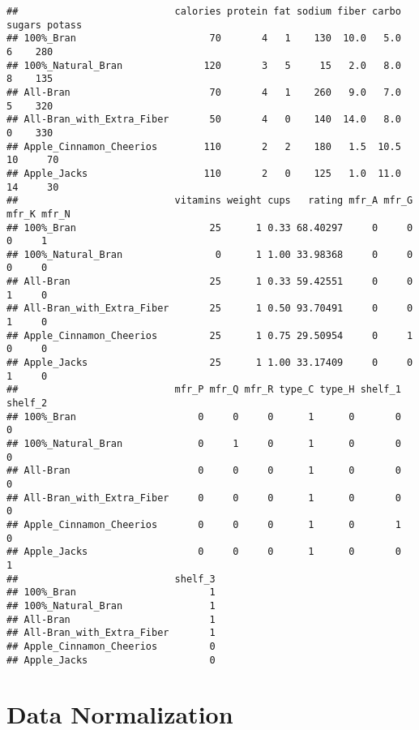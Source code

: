 \documentclass[
]{article}
\begin{document}
\begin{verbatim}
##                           calories protein fat sodium fiber carbo sugars potass
## 100%_Bran                       70       4   1    130  10.0   5.0      6    280
## 100%_Natural_Bran              120       3   5     15   2.0   8.0      8    135
## All-Bran                        70       4   1    260   9.0   7.0      5    320
## All-Bran_with_Extra_Fiber       50       4   0    140  14.0   8.0      0    330
## Apple_Cinnamon_Cheerios        110       2   2    180   1.5  10.5     10     70
## Apple_Jacks                    110       2   0    125   1.0  11.0     14     30
##                           vitamins weight cups   rating mfr_A mfr_G mfr_K mfr_N
## 100%_Bran                       25      1 0.33 68.40297     0     0     0     1
## 100%_Natural_Bran                0      1 1.00 33.98368     0     0     0     0
## All-Bran                        25      1 0.33 59.42551     0     0     1     0
## All-Bran_with_Extra_Fiber       25      1 0.50 93.70491     0     0     1     0
## Apple_Cinnamon_Cheerios         25      1 0.75 29.50954     0     1     0     0
## Apple_Jacks                     25      1 1.00 33.17409     0     0     1     0
##                           mfr_P mfr_Q mfr_R type_C type_H shelf_1 shelf_2
## 100%_Bran                     0     0     0      1      0       0       0
## 100%_Natural_Bran             0     1     0      1      0       0       0
## All-Bran                      0     0     0      1      0       0       0
## All-Bran_with_Extra_Fiber     0     0     0      1      0       0       0
## Apple_Cinnamon_Cheerios       0     0     0      1      0       1       0
## Apple_Jacks                   0     0     0      1      0       0       1
##                           shelf_3
## 100%_Bran                       1
## 100%_Natural_Bran               1
## All-Bran                        1
## All-Bran_with_Extra_Fiber       1
## Apple_Cinnamon_Cheerios         0
## Apple_Jacks                     0
\end{verbatim}

\hypertarget{data-normalization}{%
\section{Data Normalization}\label{data-normalization}}
\end{document}

